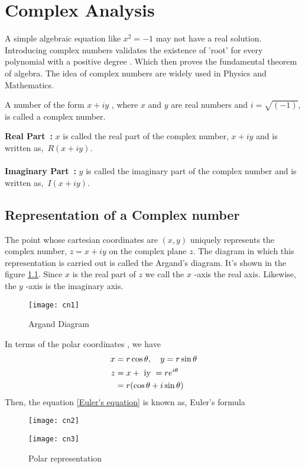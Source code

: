 \chapter{Complex Analysis}
A simple algebraic equation like $x^{2}=-1$ may not have a real solution. Introducing complex numbers validates the existence of 'root' for every polynomial with a positive degree . Which then proves the fundamental theorem of algebra. The idea of complex numbers are widely used in Physics and Mathematics.
\begin{definition}
	A number of the form {${x+i y}$} , where $x$ and $y$ are real numbers and $i=\sqrt{(-1)},$ is called a complex number.
\end{definition}
	\textbf{\large Real Part\ \hspace{1.08cm}:} $x$ is called the real part of the complex number,  $x+i y$ and is written as,\ ${{R(x+i y)}}$.\\\\ 
	\textbf{\large Imaginary Part\ :} $y$ is called the imaginary part of the complex number and is written as,\ ${I(x+i y)}$.
	\section{Representation of a Complex number}
The point whose cartesian coordinates are $(x, y)$ uniquely
represents the complex number, {${z=x+i y}$} on the complex plane $z$. The diagram in which this representation is carried out is called the Argand's diagram. It's shown in the figure \ref{Argand Diagram}.  Since $x$ is the real part of $z$ we call the $x$ -axis the real axis. Likewise, the $y$ -axis is the imaginary axis.

		\begin{figure}[H]
				\begin{center}
			\texttt{[image: cn1]}
				\end{center}
			\caption{Argand Diagram}
			\label{Argand Diagram}
	    \end{figure}
    In terms of the polar coordinates  , we have
    \begin{align}
    x&=r \cos \theta, \quad y=r \sin \theta\\
    z&=x+\text { iy }=re^{i\theta} \notag \\&=r(\cos \theta+i \sin \theta)
    \label{Euler's equation}
    \end{align}
    Then, the  equation \ref{Euler's equation} is known as, Euler's formula
    \begin{figure}[H]
    	\begin{minipage}{0.40\textwidth}
    		\begin{center}
    		\texttt{[image: cn2]}
    	\end{center}
    	\end{minipage}\hfil
    	\begin{minipage}{0.40\textwidth}
    	\begin{center}
    		\texttt{[image: cn3]}
    	\end{center}
    \end{minipage}
    
    \caption{Polar representation}
    \end{figure}
